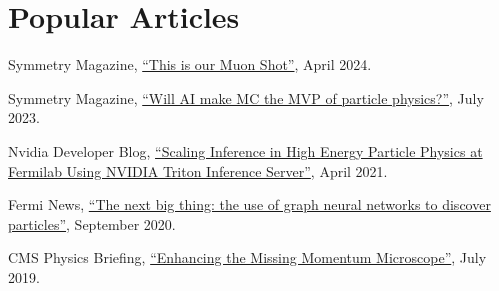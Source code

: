 \section{Popular Articles}
\begin{nbdescription}[leftmargin=12pt,font=\normalfont,labelsep=0em]
\item Symmetry Magazine, \href{https://www.symmetrymagazine.org/article/this-is-our-muon-shot}{``This is our Muon Shot''}, April 2024.
\item Symmetry Magazine, \href{https://www.symmetrymagazine.org/article/will-ai-make-mc-the-mvp-of-particle-physics}{``Will AI make MC the MVP of particle physics?''}, July 2023.
\item Nvidia Developer Blog, \href{https://developer.nvidia.com/blog/scaling-inference-in-high-energy-particle-physics-at-fermilab-using-nvidia-triton-inference-server/}{``Scaling Inference in High Energy Particle Physics at Fermilab Using NVIDIA Triton Inference Server''}, April 2021.
\item Fermi News, \href{https://news.fnal.gov/2020/09/the-next-big-thing-the-use-of-graph-neural-networks-to-discover-particles/}{``The next big thing: the use of graph neural networks to discover particles''}, September 2020.
\item CMS Physics Briefing, \href{https://cms.cern/news/enhancing-missing-momentum-microscope}{``Enhancing the Missing Momentum Microscope''}, July 2019.
\end{nbdescription}

\ifdefined\longflag
{}
